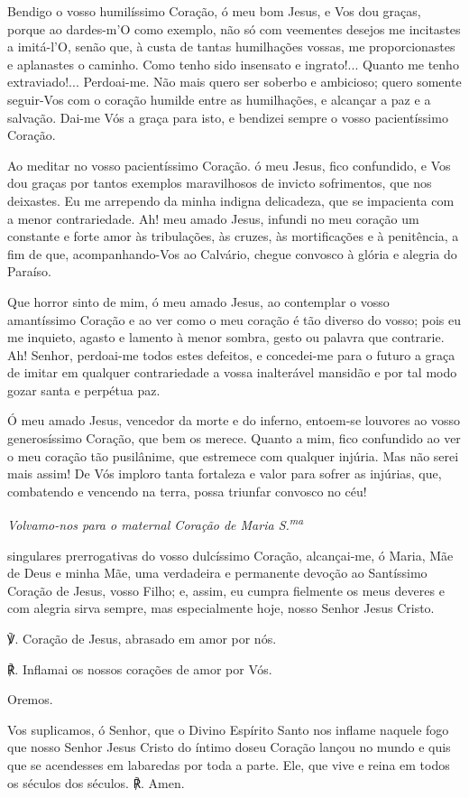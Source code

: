  Bendigo o vosso humilíssimo Coração, ó meu bom Jesus, e Vos dou graças, porque ao dardes-m’O como exemplo, não só com veementes desejos me incitastes a imitá-l’O, senão que, à custa de tantas humilhações vossas, me proporcionastes e aplanastes o caminho. Como tenho sido insensato e ingrato!... Quanto me tenho extraviado!... Perdoai-me. Não mais quero ser soberbo e ambicioso; quero somente seguir-Vos com o coração humilde entre as humilhações, e alcançar a paz e a salvação. Dai-me Vós a graça para isto, e bendizei sempre o vosso pacientíssimo Coração.

 Ao meditar no vosso pacientíssimo Coração. ó meu Jesus, fico confundido, e Vos dou graças por tantos exemplos maravilhosos de invicto sofrimentos, que nos deixastes. Eu me arrependo da minha indigna delicadeza, que se impacienta com a menor contrariedade. Ah! meu amado Jesus, infundi no meu coração um constante e forte amor às tribulações, às cruzes, às mortificações e à penitência, a fim de que, acompanhando-Vos ao Calvário, chegue convosco à glória e alegria do Paraíso.

 Que horror sinto de mim, ó meu amado Jesus, ao contemplar o vosso amantíssimo Coração e ao ver como o meu coração é tão diverso do vosso; pois eu me inquieto, agasto e lamento à menor sombra, gesto ou palavra que contrarie. Ah! Senhor, perdoai-me todos estes defeitos, e concedei-me para o futuro a graça de imitar em qualquer contrariedade a vossa inalterável mansidão e por tal modo gozar santa e perpétua paz.

Ó meu amado Jesus, vencedor da morte e do inferno, entoem-se louvores ao vosso generosíssimo Coração, que bem os merece. Quanto a mim, fico confundido ao ver o meu coração tão pusilânime, que estremece com qualquer injúria. Mas não serei mais assim! De Vós imploro tanta fortaleza e valor para sofrer as injúrias, que, combatendo e vencendo na terra, possa triunfar convosco no céu!\par

\emph{Volvamo-nos para o maternal Coração de Maria S.\textsuperscript{ma}}\par

 singulares prerrogativas do vosso dulcíssimo Coração, alcançai-me, ó Maria, Mãe de Deus e minha Mãe, uma verdadeira e permanente devoção ao Santíssimo Coração de Jesus, vosso Filho; e, assim, eu cumpra fielmente os meus deveres e com alegria sirva sempre, mas especialmente hoje, nosso Senhor Jesus Cristo.\par
℣. Coração de Jesus, abrasado em amor por nós.\par
℟. Inflamai os nossos corações de amor por Vós.\par
\begin{nscenter} Oremos. \end{nscenter}
Vos suplicamos, ó Senhor, que o Divino Espírito Santo nos inflame naquele fogo que nosso Senhor Jesus Cristo do íntimo doseu Coração lançou no mundo e quis que se acendesses em labaredas por toda a parte. Ele, que vive e reina em todos os séculos dos séculos.
℟. Amen.
